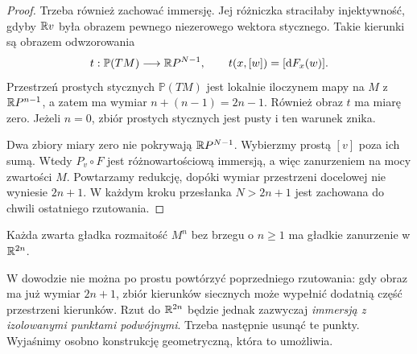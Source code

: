 \begin{proof}
Trzeba również zachować immersję. Jej
różniczka straciłaby injektywność,
gdyby $\mathbb{R} v$ była obrazem pewnego
niezerowego wektora stycznego.
Takie kierunki są obrazem odwzorowania
\[
 t:\mathbb P(TM)\longrightarrow\mathbb{R} P^{N-1},
       \qquad t(x,[w])=[\mathrm d F_x(w)].
\]
Przestrzeń prostych stycznych
$\mathbb P(TM)$ jest lokalnie iloczynem
mapy na $M$ z $\mathbb{R} P^{n-1}$, a zatem
ma wymiar $n+(n-1)=2n-1$.
Również obraz $t$ ma miarę zero.
Jeżeli $n=0$, zbiór prostych stycznych
jest pusty i ten warunek znika.

Dwa zbiory miary zero nie pokrywają
$\mathbb{R} P^{N-1}$. Wybierzmy prostą $[v]$
poza ich sumą. Wtedy $P_v\circ F$ jest
różnowartościową immersją, a więc
zanurzeniem na mocy zwartości $M$.
Powtarzamy redukcję, dopóki wymiar
przestrzeni docelowej nie wyniesie
$2n+1$. W każdym kroku przesłanka
$N>2n+1$ jest zachowana do chwili
ostatniego rzutowania.
\end{proof}

\begin{twierdzenie}
\label{thm:whitney-mocne}
Każda zwarta gładka rozmaitość $M^n$ bez brzegu
o $n\geq1$ ma gładkie zanurzenie w $\mathbb{R}^{2n}$.
\end{twierdzenie}

W dowodzie nie można po prostu powtórzyć
poprzedniego rzutowania: gdy obraz ma już
wymiar $2n+1$, zbiór kierunków siecznych
może wypełnić dodatnią część przestrzeni
kierunków. Rzut do $\mathbb{R}^{2n}$ będzie jednak
zazwyczaj \emph{immersją z izolowanymi
punktami podwójnymi}. Trzeba następnie
usunąć te punkty. Wyjaśnimy osobno
konstrukcję geometryczną, która to umożliwia.

